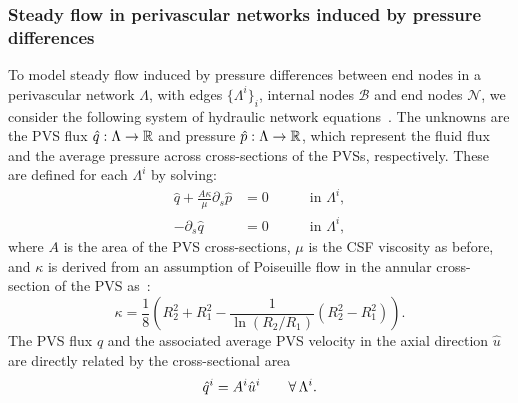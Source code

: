 
\subsubsection{Steady flow in perivascular networks induced by pressure differences}
\label{sec:app:hydraulic_network}

To model steady flow induced by pressure differences between end nodes
in a perivascular network $\Lambda$, with edges $\{\Lambda^i\}_i$,
internal nodes $\mathcal{B}$ and end nodes $\mathcal{N}$, we consider
the following system of hydraulic network
equations~\cite{tithof2022network, daversin2022geometrically,
  gjerde2024directional}. The unknowns are the PVS flux $\hat{q} :
\Lambda \rightarrow \mathbb{R}$ and pressure $\hat{p} : \Lambda
\rightarrow \mathbb{R}$, which represent the fluid flux and the average
pressure across cross-sections of the PVSs, respectively. These are
defined for each $\Lambda^i$ by solving:
\begin{subequations}
\begin{alignat}{2}
  \hat{q} + \frac{A \kappa}{\mu} \partial_{s} \hat{p} & = 0 &&
  \quad \text{ in } \Lambda^i , \\ 
  - \partial_s \hat{q} & = 0 &&
  \quad \text{ in } \Lambda^i ,  
\end{alignat} 
\label{eq:1d_flow}%
\end{subequations}%
where $A$ is the area of the PVS cross-sections, $\mu$ is the CSF viscosity as before, and $\kappa$ is derived from an assumption of Poiseuille flow in the annular cross-section of the PVS as~\cite{tithof2022network}: 
\begin{equation}
\kappa = \frac18 \left( R_2^2 + R_1^2 - \frac{1}{\ln(R_2/R_1)} (R_2^2- R_1^2) \right). 
\end{equation}
The PVS flux $\hat{q}$ and the associated average PVS velocity in the
axial direction $\hat{u}$ are directly related by the cross-sectional area
\begin{equation}
  \hat{q}^i = A^i \hat{u}^i \qquad \forall \, \Lambda^i.
\end{equation}

